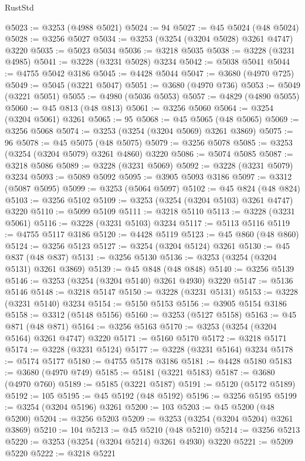 \begin{lexlean}{RustStd}
\begin{coremodule}
@5023 := @3253 (@4988 @5021)
@5024 := 94
@5027 := @45 @5024 (@48 @5024)
@5028 := @3256 @5027
@5034 := @3253 (@3254 (@3204 @5028) @3261 @4747) @3220
@5035 := @5023 @5034
@5036 := @3218 @5035
@5038 := @3228 (@3231 @4985)
@5041 := @3228 (@3231 @5028) @3234
@5042 := @5038 @5041
@5044 := @4755 @5042 @3186
@5045 := @4428 @5044
@5047 := @3680 (@4970 @725)
@5049 := @5045 (@3221 @5047)
@5051 := @3680 (@4970 @736)
@5053 := @5049 (@3221 @5051)
@5055 := @4980 (@5036 @5053)
@5057 := @4829 (@4890 @5055)
@5060 := @45 @813 (@48 @813)
@5061 := @3256 @5060
@5064 := @3254 (@3204 @5061) @3261
@5065 := 95
@5068 := @45 @5065 (@48 @5065)
@5069 := @3256 @5068
@5074 := @3253 (@3254 (@3204 @5069) @3261 @3869)
@5075 := 96
@5078 := @45 @5075 (@48 @5075)
@5079 := @3256 @5078
@5085 := @3253 (@3254 (@3204 @5079) @3261 @4860) @3220
@5086 := @5074 @5085
@5087 := @3218 @5086
@5089 := @3228 (@3231 @5069)
@5092 := @3228 (@3231 @5079) @3234
@5093 := @5089 @5092
@5095 := @3905 @5093 @3186
@5097 := @3312 (@5087 @5095)
@5099 := @3253 (@5064 @5097)
@5102 := @45 @824 (@48 @824)
@5103 := @3256 @5102
@5109 := @3253 (@3254 (@3204 @5103) @3261 @4747) @3220
@5110 := @5099 @5109
@5111 := @3218 @5110
@5113 := @3228 (@3231 @5061)
@5116 := @3228 (@3231 @5103) @3234
@5117 := @5113 @5116
@5119 := @4755 @5117 @3186
@5120 := @4428 @5119
@5123 := @45 @860 (@48 @860)
@5124 := @3256 @5123
@5127 := @3254 (@3204 @5124) @3261
@5130 := @45 @837 (@48 @837)
@5131 := @3256 @5130
@5136 := @3253 (@3254 (@3204 @5131) @3261 @3869)
@5139 := @45 @848 (@48 @848)
@5140 := @3256 @5139
@5146 := @3253 (@3254 (@3204 @5140) @3261 @4930) @3220
@5147 := @5136 @5146
@5148 := @3218 @5147
@5150 := @3228 (@3231 @5131)
@5153 := @3228 (@3231 @5140) @3234
@5154 := @5150 @5153
@5156 := @3905 @5154 @3186
@5158 := @3312 (@5148 @5156)
@5160 := @3253 (@5127 @5158)
@5163 := @45 @871 (@48 @871)
@5164 := @3256 @5163
@5170 := @3253 (@3254 (@3204 @5164) @3261 @4747) @3220
@5171 := @5160 @5170
@5172 := @3218 @5171
@5174 := @3228 (@3231 @5124)
@5177 := @3228 (@3231 @5164) @3234
@5178 := @5174 @5177
@5180 := @4755 @5178 @3186
@5181 := @4428 @5180
@5183 := @3680 (@4970 @749)
@5185 := @5181 (@3221 @5183)
@5187 := @3680 (@4970 @760)
@5189 := @5185 (@3221 @5187)
@5191 := @5120 (@5172 @5189)
@5192 := 105
@5195 := @45 @5192 (@48 @5192)
@5196 := @3256 @5195
@5199 := @3254 (@3204 @5196) @3261
@5200 := 103
@5203 := @45 @5200 (@48 @5200)
@5204 := @3256 @5203
@5209 := @3253 (@3254 (@3204 @5204) @3261 @3869)
@5210 := 104
@5213 := @45 @5210 (@48 @5210)
@5214 := @3256 @5213
@5220 := @3253 (@3254 (@3204 @5214) @3261 @4930) @3220
@5221 := @5209 @5220
@5222 := @3218 @5221

\end{coremodule}
\end{lexlean}
